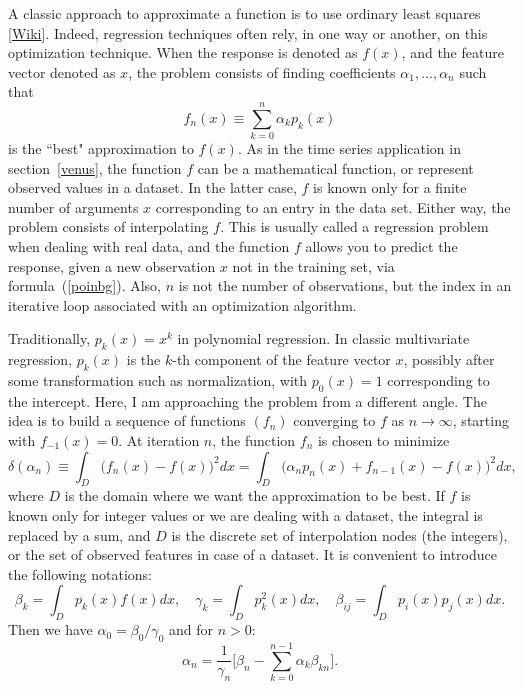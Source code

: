 \documentclass[oneside,10pt]{book}
\begin{document}
A classic approach to approximate a function is to use 
\textcolor{index}{ordinary least squares} [\href{https://en.wikipedia.org/wiki/Ordinary_least_squares}{Wiki}]. Indeed, regression techniques often rely, in one way or another, on this optimization technique. When the response is denoted as $f(x)$, and the feature vector denoted as $x$, the problem consists of finding coefficients $\alpha_1,\dots,\alpha_n$ such that
\begin{equation}
f_n(x) \equiv \sum_{k=0}^n \alpha_k p_k(x) \label{poinbg}
\end{equation}
is the ``best" approximation to $f(x)$. As in the time series application in section~\ref{venus}, the function $f$ can be a mathematical function, or represent observed values in a dataset. In the latter case, $f$ is known only for a finite number of arguments $x$ corresponding to an entry in the data set. Either way, the problem consists of interpolating $f$. This is usually called a regression problem when dealing with real data, and the function $f$ allows you to predict the response, given a new observation $x$ not in the training set, via formula~(\ref{poinbg}). Also, $n$ is not the number of observations, but the index in an iterative loop associated with an optimization algorithm. 

Traditionally, $p_k(x)=x^k$ in polynomial regression. In classic multivariate regression, $p_k(x)$ is the $k$-th component of the feature vector $x$, possibly after some transformation such as normalization, with $p_0(x)=1$ corresponding to the intercept.  Here, I am approaching the problem from a different angle. The idea is to build a sequence of functions $(f_n)$ converging to $f$ as $n\rightarrow \infty$, starting with $f_{-1}(x)=0$. At iteration $n$, the function $f_n$ is chosen to minimize 
\begin{equation}
\delta(\alpha_n)\equiv \int_D \Big(f_n(x)-f(x)\Big)^2 dx = \int_D \Big(\alpha_n p_n(x) + f_{n-1}(x) - f(x)\Big)^2 dx, \label{tupues}
\end{equation}
where $D$ is the domain where we want the approximation to be best. If $f$ is known only for integer values or we are dealing with a dataset, the integral is replaced by a sum, and $D$ is the discrete set of interpolation nodes (the integers), or the set of observed features in case of a dataset. It is convenient to introduce the following notations:
$$
\beta_k = \int_D p_k(x)f(x)dx, \quad \gamma_k = \int_D p_k^2(x)dx, \quad \beta_{ij} = \int_D p_i(x)p_j(x)dx.
$$
Then we have $\alpha_0 = \beta_0/\gamma_0$ and for $n>0$:
$$
\alpha_n = \frac{1}{\gamma_n} \Bigg[\beta_n - \sum_{k=0}^{n-1} \alpha_k\beta_{kn} \Bigg].
$$
\end{document}
